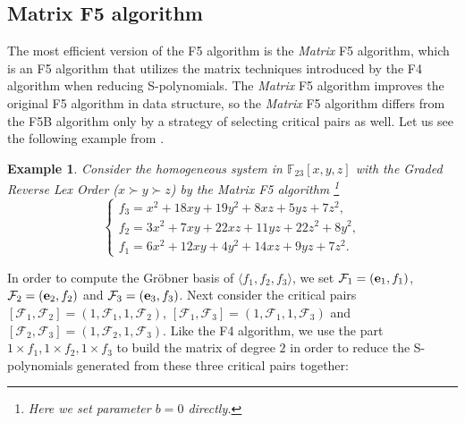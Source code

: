 \documentclass[preprint,authoryear,3p,12pt]{elsarticle}
\newtheorem{example}[theorem]{Example}
\def\F{{\mathbb{F}}}
\def\eb{{\bf e}}
\def\gr{{Gr\"obner }}
\begin{document}
\subsection{Matrix F5 algorithm}


The most efficient version of the F5 algorithm is the {\em Matrix}
F5 algorithm, which is an F5 algorithm that utilizes the matrix
techniques introduced by the F4 algorithm when reducing
S-polynomials. The {\em Matrix} F5 algorithm improves the original
F5 algorithm in data structure, so the {\em Matrix} F5 algorithm
differs from the F5B algorithm only by a strategy of selecting
critical pairs as well. Let us see the following example from
\citep{Fau02}.

\begin{example}
Consider the homogeneous system in $\F_{23}[x, y, z]$ with the
Graded Reverse Lex Order ($x\succ y\succ z$) by the Matrix F5
algorithm \footnote{Here we set parameter $b=0$ directly. }
$$\left\{\begin{array}{l} f_3=x^2+18xy+19y^2+8xz+5yz+7z^2,  \\
f_2=3x^2+7xy+22xz+11yz+22z^2+8y^2, \\
f_1=6x^2+12xy+4y^2+14xz+9yz+7z^2.
\end{array}\right. $$
\end{example}

In order to compute the \gr basis of $\langle f_1, f_2, f_3\rangle$, we set
${\mathcal F}_1=(\eb_1, f_1)$, ${\mathcal F}_2=(\eb_2, f_2)$ and
${\mathcal F}_3=(\eb_3, f_3)$. Next consider the critical pairs
$[{\mathcal F}_1, {\mathcal F}_2]=(1, {\mathcal F}_1, 1, {\mathcal
F}_2)$, $[{\mathcal F}_1, {\mathcal F}_3]=(1, {\mathcal F}_1, 1,
{\mathcal F}_3)$ and $[{\mathcal F}_2, {\mathcal F}_3]=(1,
{\mathcal F}_2, 1, {\mathcal F}_3)$. Like the F4 algorithm, we use
the part $1\times f_1, 1 \times f_2, 1 \times f_3$ to build the
matrix of degree $2$ in order to reduce the S-polynomials
generated from these three critical pairs together:
\end{document}
